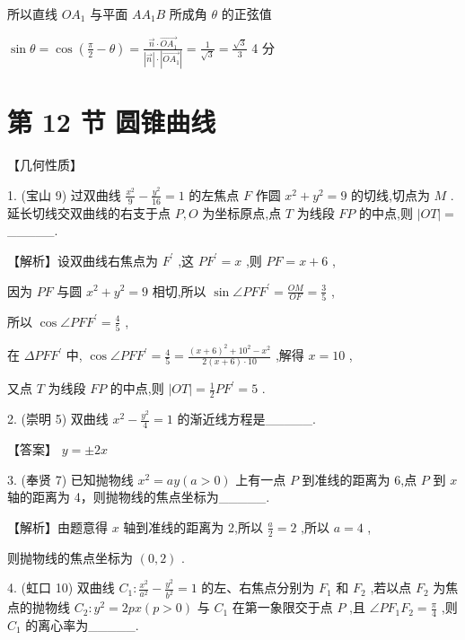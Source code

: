 \documentclass[10pt]{article}
\begin{document}
所以直线 \(O{A}_{1}\) 与平面 \(A{A}_{1}B\) 所成角 \(\theta\) 的正弦值

\(\sin \theta  = \cos \left( {\frac{\pi }{2} - \theta }\right)  = \frac{\overrightarrow{n} \cdot  \overrightarrow{O{A}_{1}}}{\left| \overrightarrow{n}\right|  \cdot  \left| \overrightarrow{O{A}_{1}}\right| } = \frac{1}{\sqrt{3}} = \frac{\sqrt{3}}{3}\) 4 分

\section*{第 12 节 圆锥曲线}

【几何性质】

1. (宝山 9) 过双曲线 \(\frac{{x}^{2}}{9} - \frac{{y}^{2}}{16} = 1\) 的左焦点 \(F\) 作圆 \({x}^{2} + {y}^{2} = 9\) 的切线,切点为 \(M\) . 延长切线交双曲线的右支于点 \(P,O\) 为坐标原点,点 \(T\) 为线段 \({FP}\) 的中点,则 \(\left| {OT}\right|  =\) \_\_\_\_\_.

【解析】设双曲线右焦点为 \({F}^{\prime }\) ,这 \(P{F}^{\prime } = x\) ,则 \({PF} = x + 6\) ,

因为 \({PF}\) 与圆 \({x}^{2} + {y}^{2} = 9\) 相切,所以 \(\sin \angle {PF}{F}^{\prime } = \frac{OM}{OF} = \frac{3}{5}\) ,

所以 \(\cos \angle {PF}{F}^{\prime } = \frac{4}{5}\) ,

在 \({\Delta PF}{F}^{\prime }\) 中, \(\cos \angle {PF}{F}^{\prime } = \frac{4}{5} = \frac{{\left( x + 6\right) }^{2} + {10}^{2} - {x}^{2}}{2\left( {x + 6}\right)  \cdot  {10}}\) ,解得 \(x = {10}\) ,

又点 \(T\) 为线段 \({FP}\) 的中点,则 \(\left| {OT}\right|  = \frac{1}{2}P{F}^{\prime } = 5\) .

2. (崇明 5) 双曲线 \({x}^{2} - \frac{{y}^{2}}{4} = 1\) 的渐近线方程是\_\_\_\_\_.

【答案】 \(y =  \pm  {2x}\)

3. (奉贤 7) 已知抛物线 \({x}^{2} = {ay}\left( {a > 0}\right)\) 上有一点 \(P\) 到准线的距离为 6,点 \(P\) 到 \(x\) 轴的距离为 4，则抛物线的焦点坐标为\_\_\_\_\_.

【解析】由题意得 \(x\) 轴到准线的距离为 2,所以 \(\frac{a}{2} = 2\) ,所以 \(a = 4\) ,

则抛物线的焦点坐标为 \(\left( {0,2}\right)\) .

4. (虹口 10) 双曲线 \({C}_{1} : \frac{{x}^{2}}{{a}^{2}} - \frac{{y}^{2}}{{b}^{2}} = 1\) 的左、右焦点分别为 \({F}_{1}\) 和 \({F}_{2}\) ,若以点 \({F}_{2}\) 为焦点的抛物线 \({C}_{2} : {y}^{2} = {2px}\left( {p > 0}\right)\) 与 \({C}_{1}\) 在第一象限交于点 \(P\) ,且 \(\angle P{F}_{1}{F}_{2} = \frac{\pi }{4}\) ,则 \({C}_{1}\) 的离心率为\_\_\_\_\_.
\end{document}
